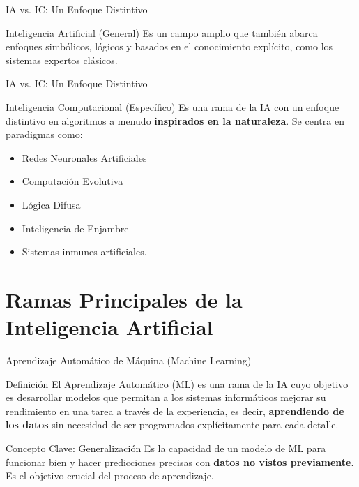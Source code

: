 \documentclass[aspectratio=169,xcolor=dvipsnames]{beamer}
\begin{document}

\begin{frame}{IA vs. IC: Un Enfoque Distintivo}
    \begin{block}{Inteligencia Artificial (General)}
        Es un campo amplio que también abarca enfoques simbólicos, lógicos y basados en el conocimiento explícito, como los sistemas expertos clásicos.
    \end{block}
\end{frame}
\begin{frame}{IA vs. IC: Un Enfoque Distintivo}
    \begin{alertblock}{Inteligencia Computacional (Específico)}
                 Es una rama de la IA con un enfoque distintivo en algoritmos a menudo \textbf{inspirados en la naturaleza}. Se centra en paradigmas como:
                 \begin{itemize}
                    \item Redes Neuronales Artificiales
                    \item Computación Evolutiva
                    \item Lógica Difusa
                    \item Inteligencia de Enjambre
                    \item Sistemas inmunes artificiales.
                \end{itemize}
            \end{alertblock}
\end{frame}
\section{Ramas Principales de la Inteligencia Artificial}

\begin{frame}{Aprendizaje Automático de Máquina (Machine Learning)}
    \begin{block}{Definición}
    El Aprendizaje Automático (ML) es una rama de la IA cuyo objetivo es desarrollar modelos que permitan a los sistemas informáticos mejorar su rendimiento en una tarea a través de la experiencia, es decir, \textbf{aprendiendo de los datos} sin necesidad de ser programados explícitamente para cada detalle.
    \end{block}
    
    \begin{alertblock}{Concepto Clave: Generalización}
    Es la capacidad de un modelo de ML para funcionar bien y hacer predicciones precisas con \textbf{datos no vistos previamente}. Es el objetivo crucial del proceso de aprendizaje.
    \end{alertblock}
\end{frame}
\end{document}
